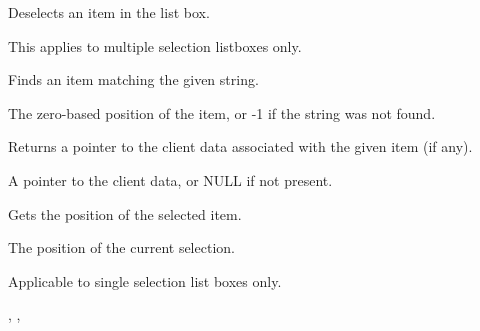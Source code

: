 
Deselects an item in the list box.




This applies to multiple selection listboxes only.

\label{wxlistboxfindstring}


Finds an item matching the given string.




The zero-based position of the item, or -1 if the string was not found.

\label{wxlistboxgetclientdata}


Returns a pointer to the client data associated with the given item (if any).




A pointer to the client data, or NULL if not present.

\label{wxlistboxgetselection}


Gets the position of the selected item.


The position of the current selection.


Applicable to single selection list boxes only.


,\rtfsp
{},\rtfsp
{}

\label{wxlistboxgetselections}

